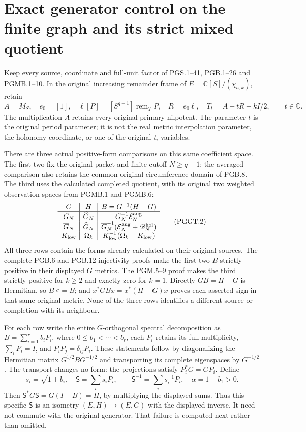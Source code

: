 \section{Exact generator control on the finite graph and its strict mixed quotient}
\label{sec:pggt}

Keep every source, coordinate and full-unit factor of
PGS.1--41, PGB.1--26 and PGMB.1--10. In the original increasing
remainder frame of $E=\mathbb C[S]/(\chi_{h,k})$, retain
\[
 A=M_S,\quad e_0=[1],\quad
 \ell[P]=[S^{q-1}]\operatorname{rem}_{\chi}P,\quad
 R=e_0\ell,\quad T_t=A+tR-kI/2,\qquad t\in\mathbb C.
 \tag{PGGT.1}\label{eq:pggt-original-generator}
\]
The multiplication $A$ retains every original primary
nilpotent. The parameter $t$ is the original period parameter;
it is not the real metric interpolation parameter, the
holonomy coordinate, or one of the original $t_i$ variables.

There are three actual positive-form comparisons on this same
coefficient space. The first two fix the original packet and
finite cutoff $N\geq q-1$; the averaged comparison also retains
the common original circumference domain of PGB.8. The third
uses the calculated completed quotient, with its original
two weighted observation spaces from PGMB.1 and PGMB.6:
\[
\begin{array}{c|c|c}
 G&H&B=G^{-1}(H-G)\\ \hline
 G_N&\widehat G_N&G_N^{-1}\mathcal E_N^{\rm aug}\\
 \overline G_N&\widehat G_N&
 \overline G_N^{-1}(\mathcal E_N^{\rm aug}+\mathscr D_N^{\rm hol})\\
 K_{\rm low}&\Omega_k&K_{\rm low}^{-1}
                                  (\Omega_k-K_{\rm low})
\end{array}
\tag{PGGT.2}\label{eq:pggt-three-comparisons}
\]
All three rows contain the forms already calculated on their
original sources. The complete PGB.6 and PGB.12 injectivity
proofs make the first two $B$ strictly positive in their
displayed $G$ metrics. The PGM.5--9 proof makes the third
strictly positive for $k\geq2$ and exactly zero for $k=1$.
Directly $GB=H-G$ is Hermitian, so $B^{\dagger_G}=B$;
and $x^*GBx=x^*(H-G)x$ proves each asserted sign in that
same original metric. None of the three rows identifies a
different source or completion with its neighbour.

For each row write the entire $G$-orthogonal spectral
decomposition as $B=\sum_{i=1}^r b_iP_i$, where
$0\leq b_1<\cdots<b_r$, each $P_i$ retains its full
multiplicity, $\sum_iP_i=I$, and $P_iP_j=\delta_{ij}P_i$.
These statements follow by diagonalizing the Hermitian
matrix $G^{1/2}BG^{-1/2}$ and transporting its complete
eigenspaces by $G^{-1/2}$. The transport changes no form:
the projections satisfy $P_i^*G=GP_i$. Define
\[
 s_i=\sqrt{1+b_i},\quad
 \mathsf S=\sum_i s_iP_i,\qquad
 \mathsf S^{-1}=\sum_i s_i^{-1}P_i,\quad
 \alpha=1+b_1>0.
 \tag{PGGT.3}\label{eq:pggt-exact-isometry}
\]
Then $\mathsf S^*G\mathsf S=G(I+B)=H$, by multiplying
the displayed sums. Thus this specific $\mathsf S$ is an
isometry $(E,H)\to(E,G)$ with the displayed inverse.
It need not commute with the original generator. That
failure is computed next rather than omitted.

